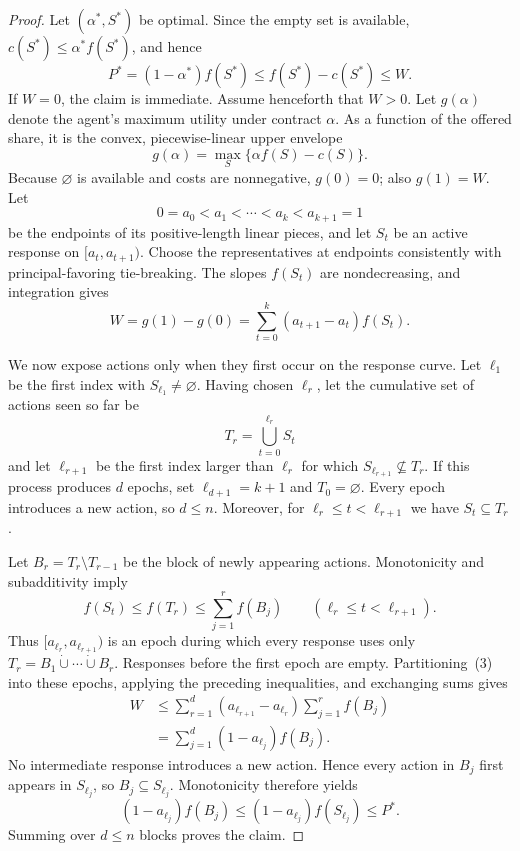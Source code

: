 \documentclass[11pt]{article}
\begin{document}
\begin{proof}
Let $(\alpha^*,S^*)$ be optimal.  Since the empty set is available,
$c(S^*)\leq\alpha^*f(S^*)$, and hence
\[
 P^*=(1-\alpha^*)f(S^*)
 \leq f(S^*)-c(S^*)
 \leq W.
\]
If $W=0$, the claim is immediate.  Assume henceforth that $W>0$.
Let $g(\alpha)$ denote the agent's maximum utility under contract $\alpha$.
As a function of the offered share, it is the convex, piecewise-linear upper
envelope
\[
        g(\alpha)=\max_S\{\alpha f(S)-c(S)\}.
\]
Because $\varnothing$ is available and costs are nonnegative, $g(0)=0$;
also $g(1)=W$.  Let
\[
0=a_0<a_1<\cdots<a_k<a_{k+1}=1
\]
be the endpoints of its positive-length linear pieces, and let $S_t$ be an
active response on $[a_t,a_{t+1})$.  Choose the representatives at endpoints
consistently with principal-favoring tie-breaking.  The slopes
$f(S_t)$ are nondecreasing, and integration gives
\[
 W=g(1)-g(0)
   =\sum_{t=0}^k(a_{t+1}-a_t)f(S_t).                      \tag{3}
\]

We now expose actions only when they first occur on the response curve.
Let $\ell_1$ be the first index with $S_{\ell_1}\ne\varnothing$.  Having
chosen $\ell_r$, let the cumulative set of actions seen so far be
\[
 T_r=\bigcup_{t=0}^{\ell_r}S_t
\]
and let $\ell_{r+1}$ be the first index larger than $\ell_r$ for which
$S_{\ell_{r+1}}\nsubseteq T_r$.  If this process produces $d$ epochs, set
$\ell_{d+1}=k+1$ and $T_0=\varnothing$.  Every epoch introduces a new
action, so $d\leq n$.  Moreover, for
$\ell_r\leq t<\ell_{r+1}$ we have $S_t\subseteq T_r$.

Let $B_r=T_r\setminus T_{r-1}$ be the block of newly appearing actions.
Monotonicity and subadditivity imply
\[
f(S_t)\leq f(T_r)\leq\sum_{j=1}^r f(B_j)
\qquad(\ell_r\leq t<\ell_{r+1}).
\]
Thus $[a_{\ell_r},a_{\ell_{r+1}})$ is an epoch during which every response
uses only
$T_r=B_1\mathbin{\dot\cup}\cdots\mathbin{\dot\cup}B_r$.
Responses before the first epoch are empty.  Partitioning~(3) into these
epochs, applying the preceding inequalities, and exchanging sums gives
\begin{align*}
W
&\leq
\sum_{r=1}^d
(a_{\ell_{r+1}}-a_{\ell_r})
\sum_{j=1}^r f(B_j)\\
&=
\sum_{j=1}^d(1-a_{\ell_j})f(B_j).
\end{align*}
No intermediate response introduces a new action.  Hence every action in
$B_j$ first appears in $S_{\ell_j}$, so $B_j\subseteq S_{\ell_j}$.
Monotonicity therefore yields
\[
(1-a_{\ell_j})f(B_j)
\leq(1-a_{\ell_j})f(S_{\ell_j})
\leq P^*.
\]
Summing over $d\leq n$ blocks proves the claim.
\end{proof}
\end{document}
